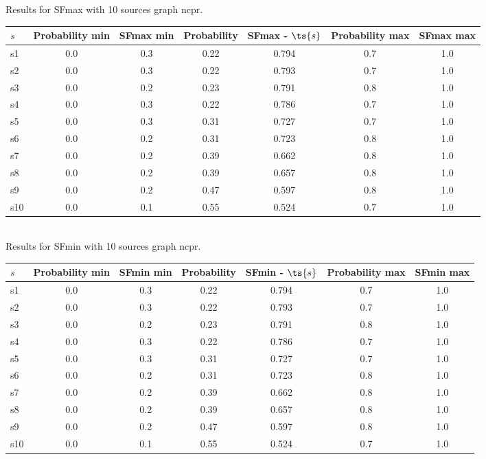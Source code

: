 \documentclass{article}
\begin{document}
\noindent Results for SFmax with 10 sources graph ncpr.

\noindent\begin{tabular}{|l|c|c|c|c|c|c|}
\hline
$s$& Probability min & SFmax min & Probability & SFmax - $\ts{s}$ & Probability max & SFmax max\\
\hline
s1 &0.0 & 0.3 & 0.22 & 0.794 & 0.7 & 1.0\\
\hline
s2 &0.0 & 0.3 & 0.22 & 0.793 & 0.7 & 1.0\\
\hline
s3 &0.0 & 0.2 & 0.23 & 0.791 & 0.8 & 1.0\\
\hline
s4 &0.0 & 0.3 & 0.22 & 0.786 & 0.7 & 1.0\\
\hline
s5 &0.0 & 0.3 & 0.31 & 0.727 & 0.7 & 1.0\\
\hline
s6 &0.0 & 0.2 & 0.31 & 0.723 & 0.8 & 1.0\\
\hline
s7 &0.0 & 0.2 & 0.39 & 0.662 & 0.8 & 1.0\\
\hline
s8 &0.0 & 0.2 & 0.39 & 0.657 & 0.8 & 1.0\\
\hline
s9 &0.0 & 0.2 & 0.47 & 0.597 & 0.8 & 1.0\\
\hline
s10 &0.0 & 0.1 & 0.55 & 0.524 & 0.7 & 1.0\\
\hline
\end{tabular}\\

\noindent Results for SFmin with 10 sources graph ncpr.

\noindent\begin{tabular}{|l|c|c|c|c|c|c|}
\hline
$s$& Probability min & SFmin min & Probability & SFmin - $\ts{s}$ & Probability max & SFmin max\\
\hline
s1 &0.0 & 0.3 & 0.22 & 0.794 & 0.7 & 1.0\\
\hline
s2 &0.0 & 0.3 & 0.22 & 0.793 & 0.7 & 1.0\\
\hline
s3 &0.0 & 0.2 & 0.23 & 0.791 & 0.8 & 1.0\\
\hline
s4 &0.0 & 0.3 & 0.22 & 0.786 & 0.7 & 1.0\\
\hline
s5 &0.0 & 0.3 & 0.31 & 0.727 & 0.7 & 1.0\\
\hline
s6 &0.0 & 0.2 & 0.31 & 0.723 & 0.8 & 1.0\\
\hline
s7 &0.0 & 0.2 & 0.39 & 0.662 & 0.8 & 1.0\\
\hline
s8 &0.0 & 0.2 & 0.39 & 0.657 & 0.8 & 1.0\\
\hline
s9 &0.0 & 0.2 & 0.47 & 0.597 & 0.8 & 1.0\\
\hline
s10 &0.0 & 0.1 & 0.55 & 0.524 & 0.7 & 1.0\\
\hline
\end{tabular}\\
\end{document}
